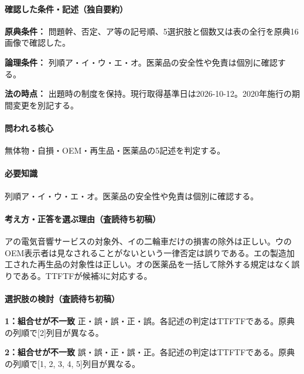 \paragraph{確認した条件・記述（独自要約）}\mbox{}\par

\noindent\textbf{原典条件：} 問題幹、否定、ア等の記号順、5選択肢と個数又は表の全行を原典16画像で確認した。\par

\noindent\textbf{論理条件：} 列順ア・イ・ウ・エ・オ。医薬品の安全性や免責は個別に確認する。\par

\noindent\textbf{法の時点：} 出題時の制度を保持。現行取得基準日は2026-10-12。2020年施行の期間変更を別記する。\par

\paragraph{問われる核心} 無体物・自損・OEM・再生品・医薬品の5記述を判定する。

\paragraph{必要知識} 列順ア・イ・ウ・エ・オ。医薬品の安全性や免責は個別に確認する。

\paragraph{考え方・正答を選ぶ理由（査読待ち初稿）} アの電気音響サービスの対象外、イの二輪車だけの損害の除外は正しい。ウのOEM表示者は見なされることがないという一律否定は誤りである。エの製造加工された再生品の対象性は正しい。オの医薬品を一括して除外する規定はなく誤りである。TTFTFが候補3に対応する。

\paragraph{選択肢の検討（査読待ち初稿）}\mbox{}\par

\noindent\textbf{1：組合せが不一致} 正・誤・誤・正・誤。各記述の判定はTTFTFである。原典の列順で[2]列目が異なる。\par

\noindent\textbf{2：組合せが不一致} 誤・誤・正・誤・正。各記述の判定はTTFTFである。原典の列順で[1, 2, 3, 4, 5]列目が異なる。\par

